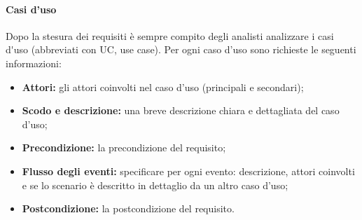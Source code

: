 \paragraph{Casi d'uso}
Dopo la stesura dei requisiti è sempre compito degli analisti analizzare i \gls{casi d'uso} (abbreviati con UC, use case).
Per ogni caso d'uso sono richieste le seguenti informazioni:
\begin{itemize}
	\item \textbf{Attori:} gli attori coinvolti nel caso d'uso (principali e secondari);
	\item \textbf{Scodo e descrizione:} una breve descrizione chiara e dettagliata del caso d'uso;
	\item \textbf{Precondizione:} la precondizione del requisito;
	\item \textbf{Flusso degli eventi:} specificare per ogni evento: descrizione, attori coinvolti e se lo scenario è descritto in dettaglio da un altro caso d'uso;
	\item \textbf{Postcondizione:} la postcondizione del requisito.
\end{itemize}

\newpage
